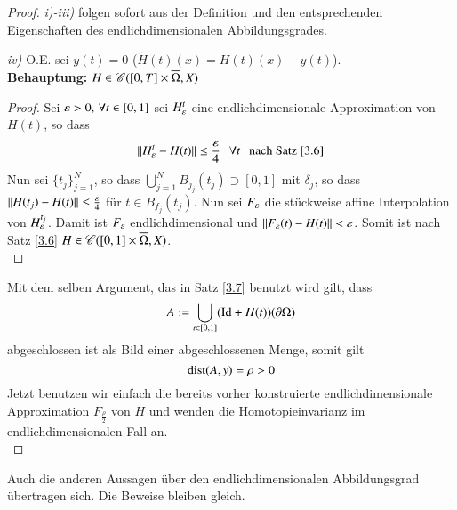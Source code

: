 \begin{proof}
    \textit{i)-iii)} folgen sofort aus der Definition und den entsprechenden Eigenschaften des
    endlichdimensionalen Abbildungsgrades.

    \noindent\textit{iv)} 
        O.E. sei $y(t)=0$ ($\tilde H(t)(x)=H(t)(x)-y(t)$).\\
        \textbf{Behauptung:} $H\in \mathscr C([0,T]\times \overline\Omega,X)$
        \begin{proof}
            Sei $\varepsilon >0,\, \forall t\in [0,1]$ sei $H_\varepsilon^t$ eine endlichdimensionale Approximation
            von $H(t)$, so dass
            \[
                \|H_\varepsilon^t-H(t)\|\leq\frac{\varepsilon}4 \hspace{.25cm} \forall t \hspace{.25cm} \text{nach Satz \ref{3.6}}
            \]
            Nun sei $\{t_j\}_{j=1}^N$, so dass $\bigcup _{j=1}^N B_{j_j}(t_j)\supset [0,1]$ mit $\delta_j
            $, so dass $\|H(t_j)-H(t)\|\leq \frac{\varepsilon}4$ für $t\in B_{f_j}(t_j)$. Nun sei $F_\varepsilon$ die
            stückweise affine Interpolation von $H_\varepsilon^{t_j}$. Damit ist $F_\varepsilon$ endlichdimensional und
            $\|F_\varepsilon(t)-H(t)\|<\varepsilon$. Somit ist nach Satz \ref{3.6} $H\in \mathscr C([0,1]\times 
            \overline \Omega, X)$.
            \[ \]
        \end{proof}
        Mit dem selben Argument, das in Satz \ref{3.7} benutzt wird gilt, dass
        \[
            A:=\bigcup_{t\in [0,1]} (\mathrm{Id}+H(t))(\partial \Omega)
        \]
        abgeschlossen ist als Bild einer abgeschlossenen Menge, somit gilt
        \[
            \mathrm{dist}(A,y)=\rho>0
        \]
        Jetzt benutzen wir einfach die bereits vorher konstruierte endlichdimensionale Approximation 
        $F_{\frac\rho2}$ von $H$ und wenden die Homotopieinvarianz im endlichdimensionalen Fall an.
        \[ \]
\end{proof}

Auch die anderen Aussagen über den endlichdimensionalen Abbildungsgrad übertragen sich.
Die Beweise bleiben gleich.

